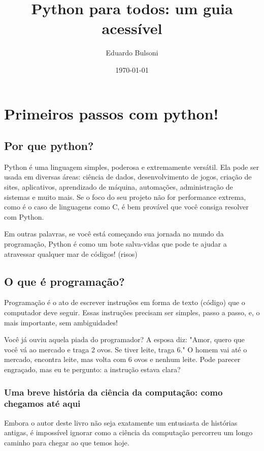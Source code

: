 \documentclass[12pt]{book}
\title{Python para todos: um guia acessível}
\author{Eduardo Bulsoni}
\date{\today}
\begin{document}
	\maketitle
	\tableofcontents
	\chapter{Primeiros passos com python!}
	
	\section{Por que python?}
	
	Python é uma linguagem simples, poderosa e extremamente versátil. Ela pode ser usada em diversas áreas: ciência de dados, desenvolvimento de jogos, criação de sites, aplicativos, aprendizado de máquina, automações, administração de sistemas e muito mais. Se o foco do seu projeto não for performance extrema, como é o caso de linguagens como C, é bem provável que você consiga resolver com Python.

	Em outras palavras, se você está começando sua jornada no mundo da programação, Python é como um bote salva-vidas que pode te ajudar a atravessar qualquer mar de códigos! (risos) \newline
	
	\section{O que é programação?}
	
	Programação é o ato de escrever instruções em forma de texto (código) que o computador deve seguir. Essas instruções precisam ser simples, passo a passo, e, o mais importante, sem ambiguidades!
	
	Você já ouviu aquela piada do programador? A esposa diz: "Amor, quero que você vá ao mercado e traga 2 ovos. Se tiver leite, traga 6." O homem vai até o mercado, encontra leite, mas volta com 6 ovos e nenhum leite. Pode parecer engraçado, mas eu te pergunto: a instrução estava clara?
	
	\subsection{Uma breve história da ciência da computação: como chegamos até aqui}
	
	Embora o autor deste livro não seja exatamente um entusiasta de histórias antigas, é impossível ignorar como a ciência da computação percorreu um longo caminho para chegar ao que temos hoje.
	
\end{document}
